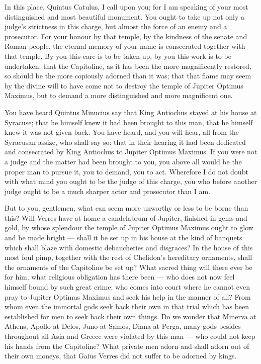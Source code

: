  In this place, Quintus Catulus, I call upon you; for I am speaking of your most distinguished and most beautiful monument. You ought to take up not only a judge's strictness in this charge, but almost the force of an enemy and a prosecutor. For your honour by that temple, by the kindness of the senate and Roman people, the eternal memory of your name is consecrated together with that temple. By you this care is to be taken up, by you this work is to be undertaken: that the Capitoline, as it has been the more magnificently restored, so should be the more copiously adorned than it was; that that flame may seem by the divine will to have come not to destroy the temple of Jupiter Optimus Maximus, but to demand a more distinguished and more magnificent one.

 You have heard Quintus Minucius say that King Antiochus stayed at his house at Syracuse; that he himself knew it had been brought to this man, that he himself knew it was not given back. You have heard, and you will hear, all from the Syracusan assize, who shall say so: that in their hearing it had been dedicated and consecrated by King Antiochus to Jupiter Optimus Maximus. If you were not a judge and the matter had been brought to you, you above all would be the proper man to pursue it, you to demand, you to act. Wherefore I do not doubt with what mind you ought to be the judge of this charge, you who before another judge ought to be a much sharper actor and prosecutor than I am.

 But to you, gentlemen, what can seem more unworthy or less to be borne than this? Will Verres have at home a candelabrum of Jupiter, finished in gems and gold, by whose splendour the temple of Jupiter Optimus Maximus ought to glow and be made bright --- shall it be set up in his house at the kind of banquets which shall blaze with domestic debaucheries and disgraces? In the house of this most foul pimp, together with the rest of Chelidon's hereditary ornaments, shall the ornaments of the Capitoline be set up? What sacred thing will there ever be for him, what religious obligation has there been --- who does not now feel himself bound by such great crime; who comes into court where he cannot even pray to Jupiter Optimus Maximus and seek his help in the manner of all? From whom even the immortal gods seek back their own in that trial which has been established for men to seek back their own things. Do we wonder that Minerva at Athens, Apollo at Delos, Juno at Samos, Diana at Perga, many gods besides throughout all Asia and Greece were violated by this man --- who could not keep his hands from the Capitoline? What private men adorn and shall adorn out of their own moneys, that Gaius Verres did not suffer to be adorned by kings.

